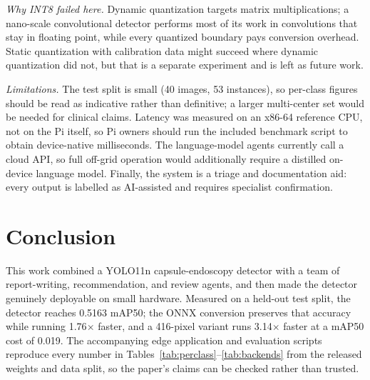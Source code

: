 \documentclass[conference]{IEEEtran}
\begin{document}
\emph{Why INT8 failed here.} Dynamic quantization targets matrix
multiplications; a nano-scale convolutional detector performs most of its
work in convolutions that stay in floating point, while every quantized
boundary pays conversion overhead. Static quantization with calibration data
might succeed where dynamic quantization did not, but that is a separate
experiment and is left as future work.

\emph{Limitations.} The test split is small (40 images, 53 instances), so
per-class figures should be read as indicative rather than definitive; a
larger multi-center set would be needed for clinical claims. Latency was
measured on an x86-64 reference CPU, not on the Pi itself, so Pi owners should
run the included benchmark script to obtain device-native milliseconds. The
language-model agents currently call a cloud API, so full off-grid operation
would additionally require a distilled on-device language model. Finally, the
system is a triage and documentation aid: every output is labelled as
AI-assisted and requires specialist confirmation.

\section{Conclusion}
\label{sec:conclusion}

This work combined a YOLO11n capsule-endoscopy detector with a team of
report-writing, recommendation, and review agents, and then made the detector
genuinely deployable on small hardware. Measured on a held-out test split,
the detector reaches 0.5163 mAP50; the ONNX conversion preserves that
accuracy while running 1.76$\times$ faster, and a 416-pixel variant runs
3.14$\times$ faster at a mAP50 cost of 0.019. The accompanying edge
application and evaluation scripts reproduce every number in
Tables~\ref{tab:perclass}--\ref{tab:backends} from the released weights and
data split, so the paper's claims can be checked rather than trusted.



\end{document}
